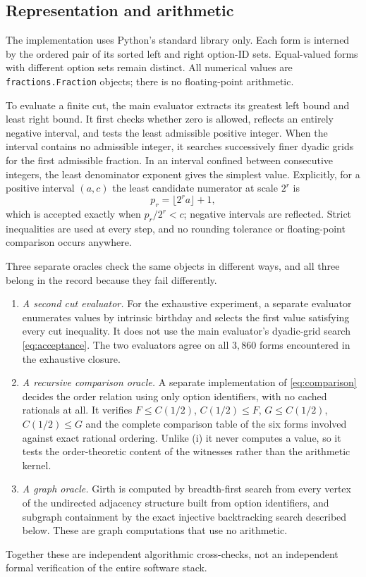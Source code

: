 \documentclass[11pt,a4paper]{article}
\numberwithin{equation}{section}
\theoremstyle{definition}
\theoremstyle{remark}
\newcommand{\can}{C}
\newcommand{\code}[1]{\texttt{#1}}
\begin{document}
\subsection{Representation and arithmetic}

The implementation uses Python's standard library only. Each form is interned
by the ordered pair of its sorted left and right option-ID sets. Equal-valued
forms with different option sets remain distinct. All numerical values are
\code{fractions.Fraction} objects; there is no floating-point arithmetic.

To evaluate a finite cut, the main evaluator extracts its greatest left bound
and least right bound. It first checks whether zero is allowed, reflects an
entirely negative interval, and tests the least admissible positive integer.
When the interval contains no admissible integer, it searches successively
finer dyadic grids for the first admissible fraction. In an interval confined
between consecutive integers, the least denominator exponent gives the
simplest value. Explicitly, for a positive interval $(a,c)$ the least candidate
numerator at scale $2^r$ is
\begin{equation}
\label{eq:acceptance}
 p_r=\lfloor 2^r a\rfloor+1,
\end{equation}
which is accepted exactly when $p_r/2^r<c$; negative intervals are reflected.
Strict inequalities are used at every step, and no rounding tolerance or
floating-point comparison occurs anywhere.

Three separate oracles check the same objects in different ways, and all three
belong in the record because they fail differently.
\begin{enumerate}[label=(\roman*),leftmargin=2.2em]
\item \emph{A second cut evaluator.} For the exhaustive experiment, a separate
 evaluator enumerates values by intrinsic birthday and selects the first value
 satisfying every cut inequality. It does not use the main evaluator's
 dyadic-grid search \eqref{eq:acceptance}. The two evaluators agree on all
 $3{,}860$ forms encountered in the exhaustive closure.
\item \emph{A recursive comparison oracle.} A separate implementation of
 \eqref{eq:comparison} decides the order relation using only option
 identifiers, with no cached rationals at all. It verifies $F\leq\can(1/2)$,
 $\can(1/2)\leq F$, $G\leq\can(1/2)$, $\can(1/2)\leq G$ and the complete
 comparison table of the six forms involved against exact rational ordering.
 Unlike (i) it never computes a value, so it tests the order-theoretic content
 of the witnesses rather than the arithmetic kernel.
\item \emph{A graph oracle.} Girth is computed by breadth-first search from
 every vertex of the undirected adjacency structure built from option
 identifiers, and subgraph containment by the exact injective backtracking
 search described below. These are graph computations that use no arithmetic.
\end{enumerate}
Together these are independent algorithmic cross-checks, not an independent
formal verification of the entire software stack.
\end{document}
